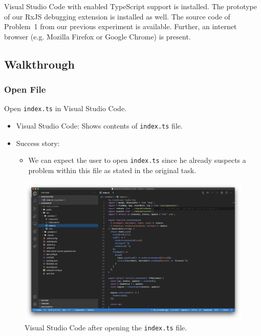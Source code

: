 \documentclass[sigplan,screen,nonacm,review]{acmart}
\begin{document}
Visual Studio Code with enabled TypeScript support is installed. The prototype of our RxJS debugging extension is installed as well. The source code of Problem~1 from our previous experiment is available. Further, an internet browser (e.g. Mozilla Firefox or Google Chrome) is present.

\subsection{Walkthrough}


\subsubsection{Open File}
Open \texttt{index.ts} in Visual Studio Code.

\begin{itemize}
	\item Visual Studio Code: Shows contents of \texttt{index.ts} file.
	\item Success story:
	      \begin{itemize}
	      	\item We can expect the user to open \texttt{index.ts} since he already suspects a problem within this file as stated in the original task.
	      \end{itemize}
\end{itemize}

\begin{figure}[ht]
	\centering
	\includegraphics[width=\columnwidth]{walkthrough-screenshots/step1.png}
	\Description{}
	\caption{Visual Studio Code after opening the \texttt{index.ts} file.}
	\label{fig:walkthrough-screesnhot-step-1}
\end{figure}
\end{document}

